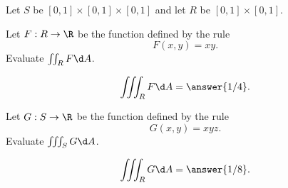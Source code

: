 \documentclass{ximera}
\author{Jim Fowler}
\begin{document}
\begin{exercise}
  Let $S$ be $[0,1] \times [0,1] \times [0,1]$ and let $R$ be $[0,1] \times [0,1]$.
  
  Let $F : R \to \R$ be the function defined by the rule
  \[
    F(x,y) = xy.
  \]
  Evaluate $\iint_R F \d A$.
  
  \begin{prompt}
    \[
      \iiint_R F \d A = \answer{1/4}.
    \]
  \end{prompt}
\end{exercise}

\begin{exercise}
  Let $G : S \to \R$ be the function defined by the rule
  \[
    G(x,y) = xyz.
  \]
  Evaluate $\iiint_S G \d A$.
  
  \begin{prompt}
    \[
      \iiint_R G \d A = \answer{1/8}.
    \]
  \end{prompt}

\end{exercise}
\end{document}
